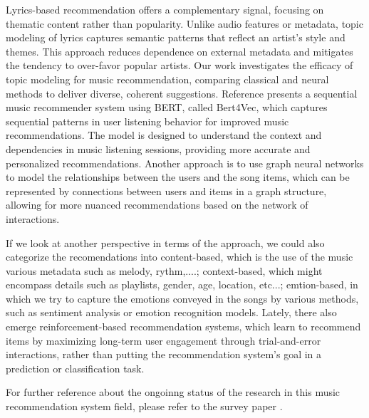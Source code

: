 \documentclass[12pt]{article}
\begin{document}
Lyrics-based recommendation offers a complementary signal, focusing on thematic
content rather than popularity. Unlike audio features or metadata, topic
modeling of lyrics captures semantic patterns that reflect an artist's style
and themes. This approach reduces dependence on external metadata and mitigates
the tendency to over-favor popular artists. Our work investigates the efficacy
of topic modeling for music recommendation, comparing classical and neural
methods to deliver diverse, coherent suggestions. Reference
\cite{yadav2020bidirectional} presents a sequential music recommender system
using BERT, called Bert4Vec, which captures sequential patterns in user
listening behavior for improved music recommendations. The model is designed to
understand the context and dependencies in music listening sessions, providing
more accurate and personalized recommendations. Another approach is to use
graph neural networks to model the relationships between the users and the song
items, which can be represented by connections between users and items in a
graph structure, allowing for more nuanced recommendations based on the network
of interactions.

If we look at another perspective in terms of the approach, we could also
categorize the recomendations into content-based, which is the use of the music
various metadata such as melody, rythm,....; context-based, which might
encompass details such as playlists, gender, age, location, etc...;
emtion-based, in which we try to capture the emotions conveyed in the songs by
various methods, such as sentiment analysis or emotion recognition models.
Lately, there also emerge reinforcement-based recommendation systems, which
learn to recommend items by maximizing long-term user engagement through
trial-and-error interactions, rather than putting the recommendation system's
goal in a prediction or classification task.

For further reference about the ongoinng status of the research in this music
recommendation system field, please refer to the survey paper
\cite{musicrecsurvey}.
\end{document}
